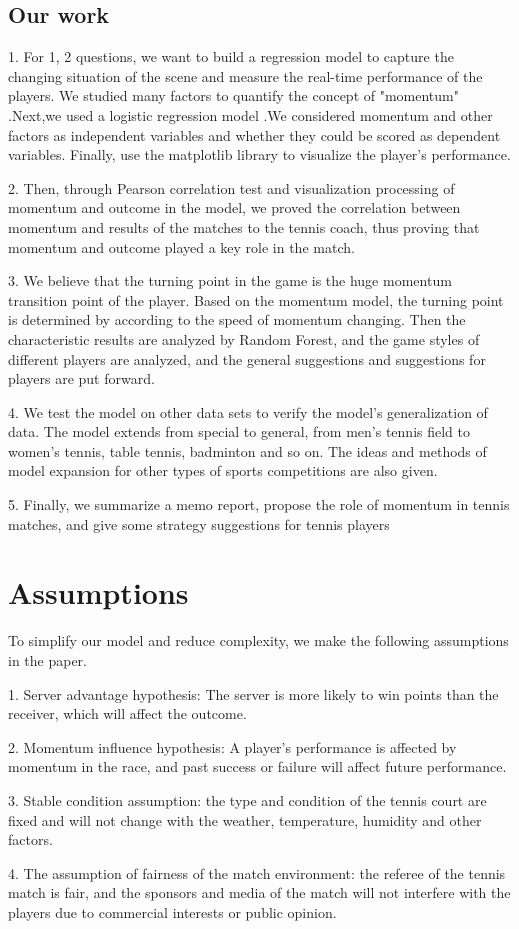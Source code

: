 \documentclass{mcmthesis}  %
\begin{document}
\subsection{Our work}  %
\hspace{1.5em}1. For 1, 2 questions, we want to build a regression model to capture the changing situation of the scene and measure the real-time performance of the players. We studied many factors to quantify the concept of "momentum" .Next,we used a logistic regression model .We considered momentum  and other factors as independent variables and whether they could be scored as dependent variables. Finally, use the matplotlib library to visualize the player's performance.%
\par2. Then, through Pearson correlation test and visualization processing of momentum and outcome in the model, we proved the correlation between momentum and results of the matches to the tennis coach, thus proving that momentum and outcome played a key role in the match.
\par3. We believe that the turning point in the game is the huge momentum transition point of the player. Based on the momentum model, the turning point is determined by  according to the speed of momentum changing. Then the characteristic results are analyzed by Random Forest, and the game styles of different players are analyzed, and the general suggestions and suggestions for players are put forward.
\par4. We test the model on other data sets to verify the model's generalization of data. The model extends from special to general, from men's tennis field to women's tennis, table tennis, badminton and so on. The ideas and methods of model expansion for other types of sports competitions are also given.
\par5. Finally, we summarize a memo report, propose the role of momentum in tennis matches, and give some strategy suggestions for tennis players

\section{Assumptions}  %
\hspace{1.5em}To simplify our model and reduce complexity, we make the following assumptions in the paper.
\par 
1. Server advantage hypothesis: The server is more likely to win points than the receiver, which will affect the outcome.\cite{ZGTK202311031139}\par 
2. Momentum influence hypothesis: A player's performance is affected by momentum in the race, and past success or failure will affect future performance.\par  
3. Stable condition assumption: the type and condition of the tennis court are fixed and will not change with the weather, temperature, humidity and other factors.\cite{SPOR202304012}\par  
4. The assumption of fairness of the match environment: the referee of the tennis match is fair, and the sponsors and media of the match will not interfere with the players due to commercial interests or public opinion.
\end{document}
